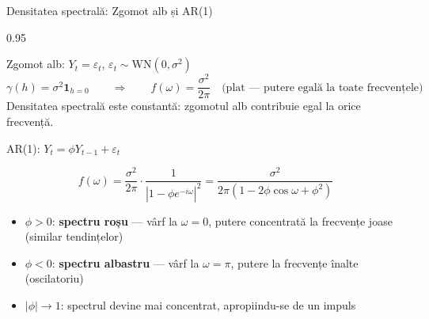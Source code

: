 \documentclass[9pt, aspectratio=169, t]{beamer}
\begin{document}
\begin{frame}{Densitatea spectrală: Zgomot alb și AR(1)}
    \begin{cminipage}{0.95\textwidth}
    \vspace{-2mm}
    \begin{block}{Zgomot alb: $Y_t = \varepsilon_t$, $\varepsilon_t \sim \text{WN}(0, \sigma^2)$}
        {\small
        \[
            \gamma(h) = \sigma^2 \mathbf{1}_{h=0} \qquad\Longrightarrow\qquad f(\omega) = \frac{\sigma^2}{2\pi} \quad \text{(plat --- putere egală la toate frecvențele)}
        \]
        Densitatea spectrală este constantă: zgomotul alb contribuie egal la orice frecvență.}
    \end{block}
    \vspace{-2mm}
    \begin{block}{AR(1): $Y_t = \phi Y_{t-1} + \varepsilon_t$}
        {\small
        \[
            f(\omega) = \frac{\sigma^2}{2\pi} \cdot \frac{1}{|1 - \phi e^{-i\omega}|^2} = \frac{\sigma^2}{2\pi(1 - 2\phi\cos\omega + \phi^2)}
        \]
        \begin{itemize}\setlength{\itemsep}{0pt}
            \item $\phi > 0$: \textbf{spectru roșu} --- vârf la $\omega = 0$, putere concentrată la frecvențe joase (similar tendințelor)
            \item $\phi < 0$: \textbf{spectru albastru} --- vârf la $\omega = \pi$, putere la frecvențe înalte (oscilatoriu)
            \item $|\phi| \to 1$: spectrul devine mai concentrat, apropiindu-se de un impuls
        \end{itemize}}
    \end{block}
    \end{cminipage}
\end{frame}
\end{document}
